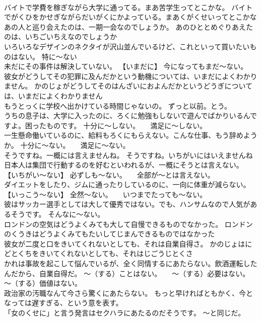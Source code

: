 \documentclass[8pt]{extreport}
\begin{document}
\begin{CJK}{UTF8}{min}
\\	バイトで学費を稼ぎながら大学に通ってる。まあ苦学生ってとこかな。	バイトでがくひをかせぎながらだいがくにかよっている。まあくがくせいってとこかな 
\\	あの人と巡り会えたのは、一期一会なのでしょうか。	あのひととめぐりあえたのは、いちごいちえなのでしょうか 
\\	いろいろなデザインのネクタイが沢山並んでいるけど、これといって買いたいものはない。	特に～ない
\\	未だにその事件は解決していない。	【いまだに】 今になってもまだ～ない。
\\	彼女がどうしてその犯罪に及んだかという動機については、いまだによくわかりません。	かのじょがどうしてそのはんざいにおよんだかというどうぎについては、いまだによくわかりません 
\\	もうとっくに学校へ出かけている時間じゃないの。	ずっと以前。とう。
\\	うちの息子は、大学に入ったのに、ろくに勉強もしないで遊んでばかりいるんですよ。困ったものです。	十分に～しない。　　満足に～しない。
\\	一生懸命働いているのに、給料もろくにもらえない。こんな仕事、もう辞めようか。	十分に～ない。　　満足に～ない。
\\	そうですね。一概には言えませんね。	そうですね。いちがいにはいえませんね 
\\	日本人は集団で行動するのを好むといわれるが、一概にそうとは言えない。	【いちがい～ない】 必ずしも～ない。　　全部が～とは言えない。
\\	ダイエットをしたり、ジムに通ったりしているのに、一向に体重が減らない。	【いっこう～ない】 全然～ない。　　いつまでたっても～ない。
\\	彼はサッカー選手としては大して優秀ではない。でも、ハンサムなので人気があるそうです。	そんなに～ない。
\\	ロンドンの空気はどうよくみても大して自慢できるものでなかった。	ロンドンのくうきはどうよくみてもたいしてじまんできるものではなかった 
\\	彼女が二度と口をきいてくれないとしても、それは自業自得さ。	かのじょはにどとくちをきいてくれないとしても、それはじごうじとくさ 
\\	かれは事故を起こして悩んでいるが、全く同情するにあたらない。飲酒運転したんだから、自業自得だ。	～（する）ことはない。　　～（する）必要はない。　　～（する）価値はない。
\\	政治家の汚職なんて今さら驚くにあたらない。	もっと早ければともかく、今となっては遅すぎる、という意を表す。
\\	「女のくせに」と言う発言はセクハラにあたるのだそうです。	～と同じだ。

\end{CJK}
\end{document}
